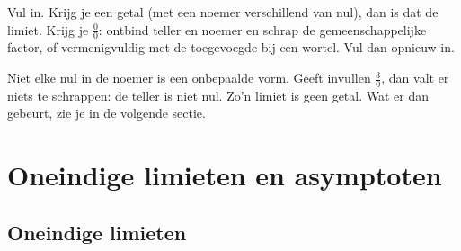 \begin{oefeningen}
\end{oefeningen}

\begin{werkwijze}
Vul in. Krijg je een getal (met een noemer verschillend van nul), dan is dat de limiet. Krijg je $\frac00$: ontbind teller en noemer en schrap de gemeenschappelijke factor, of vermenigvuldig met de toegevoegde bij een wortel. Vul dan opnieuw in.
\end{werkwijze}

Niet elke nul in de noemer is een onbepaalde vorm. Geeft invullen $\frac{3}{0}$, dan valt er niets te schrappen: de teller is niet nul. Zo'n limiet is geen getal. Wat er dan gebeurt, zie je in de volgende sectie.

\begin{oefeningen}
\end{oefeningen}

\section{Oneindige limieten en asymptoten}

\subsection{Oneindige limieten}



